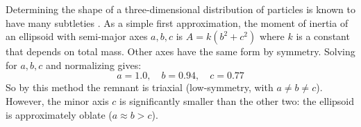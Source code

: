 \documentclass[twocolumn]{aastex63}
\begin{document}
Determining the shape of a three-dimensional distribution of particles is known to have many subtleties \citep{maccio_concentration_2007, jing_triaxial_2002}. As a simple first approximation, the moment of inertia of an ellipsoid with semi-major axes $a, b, c$ is $A = k(b^2 + c^2)$ where $k$ is a constant that depends on total mass. Other axes have the same form by symmetry. Solving for $a, b, c$ and normalizing gives:
\[ a = 1.0,\quad b = 0.94,\quad c = 0.77 \]
So by this method the remnant is triaxial (low-symmetry, with $a \ne b \ne c$). However, the minor axis $c$ is significantly smaller than the other two: the ellipsoid is approximately oblate ($a \approx b > c$).

%
%
\end{document}
